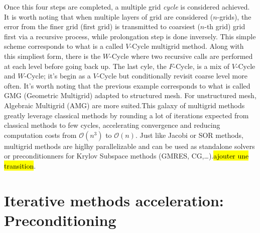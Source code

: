 Once this four steps are completed, a multiple grid \textit{cycle} is considered achieved. It is worth noting that when multiple layers of grid are considered ($n$-grids), the error from the finer grid (first grid) is transmitted to coarsiest ($n$-th grid) grid first via a recursive process, while prolongation step is done inversely. This simple scheme corresponds to what is a called $V$-Cycle multigrid method. Along with this simpliest form, there is the $W$-Cycle where two recursive calls are performed at each level before going back up. The last cyle, the $F$-Cycle, is a mix of $V$-Cycle and $W$-Cycle; it's begin as a $V$-Cycle but conditionally revisit coarse level more often. It's worth noting that the previous example corresponds to what is called GMG (Geometric Multigrid) adapted to structured mesh. For unstructured mesh, Algebraic Multigrid (AMG) are more suited.This galaxy of multigrid methods greatly leverage classical methods by rounding a lot of iterations expected from classical methods to few cycles, accelerating convergence and reducing computation costs from $\mathcal{O}(n^3)$ to $\mathcal{O}(n)$. Just like Jacobi or SOR methods, multigrid methods are higlhy parallelizable and can be used as standalone solvers or preconditionners for Krylov Subspace methods (GMRES, CG,\dots).\hl{ajouter une transition}.


\section{Iterative methods acceleration: Preconditioning}

